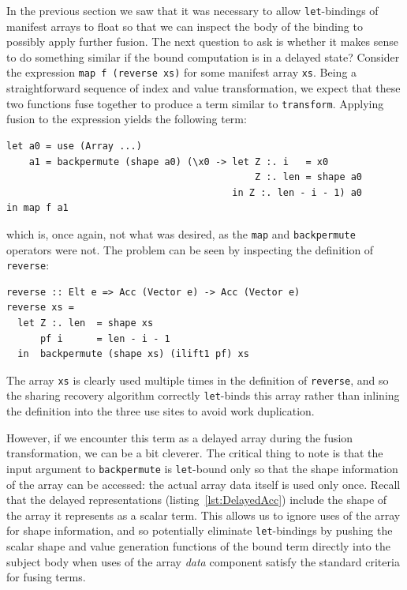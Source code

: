 In the previous section we saw that it was necessary to allow
\texttt{let}-bindings of manifest arrays to float so that we can inspect the
body of the binding to possibly apply further fusion. The next question to ask
is whether it makes sense to do something similar if the bound computation is in
a delayed state? Consider the expression
\lstinline[style=inline]{map f (reverse xs)}
for some manifest array \texttt{xs}. Being a straightforward sequence of index
and value transformation, we expect that these two functions fuse together to
produce a term similar to \texttt{transform}. Applying fusion to the expression
yields the following term:
%
\begin{lstlisting}[style=haskell]
let a0 = use (Array ...)
    a1 = backpermute (shape a0) (\x0 -> let Z :. i   = x0
                                            Z :. len = shape a0
                                        in Z :. len - i - 1) a0
in map f a1
\end{lstlisting}
%
which is, once again, not what was desired, as the \texttt{map} and
\texttt{backpermute} operators were not. The problem can be seen by inspecting
the definition of \texttt{reverse}:
%
\begin{lstlisting}[style=haskell]
reverse :: Elt e => Acc (Vector e) -> Acc (Vector e)
reverse xs =
  let Z :. len  = shape xs
      pf i      = len - i - 1
  in  backpermute (shape xs) (ilift1 pf) xs
\end{lstlisting}
%
The array \texttt{xs} is clearly used multiple times in the definition of
\texttt{reverse}, and so the sharing recovery algorithm correctly
\texttt{let}-binds this array rather than inlining the definition into the three
use sites to avoid work duplication.

However, if we encounter this term as a delayed array during the fusion
transformation, we can be a bit cleverer. The critical thing to note is that the
input argument to \texttt{backpermute} is \texttt{let}-bound only so that the
shape information of the array can be accessed: the actual array data itself is
used only once. Recall that the delayed representations
(listing~\ref{lst:DelayedAcc}) include the shape of the array it represents as a
scalar term. This allows us to ignore uses of the array for shape information,
and so potentially eliminate \texttt{let}-bindings by pushing the scalar shape
and value generation functions of the bound term directly into the subject body
when uses of the array \emph{data} component satisfy the standard criteria for
fusing terms.

